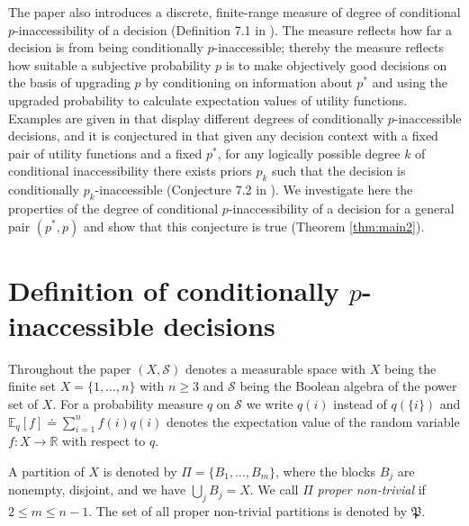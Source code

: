 \documentclass[10pt, letterpaper]{article}%
\theoremstyle{definition}
\newcommand{\E}{\mathbb E}
\newcommand{\1}{\mathbf 1}
\begin{document}
The paper \cite{Redei-Jing2026} also introduces a discrete, finite-range measure of degree of conditional $p$-inaccessibility of a decision (Definition 7.1 in \cite{Redei-Jing2026}). The measure reflects how far a decision is from being conditionally $p$-inaccessible; thereby the measure reflects how suitable a subjective probability $p$ is to make objectively good decisions on the basis of upgrading $p$ by conditioning on information about $p^*$ and using the upgraded probability to calculate expectation values of utility functions. Examples are given in \cite{Redei-Jing2026} that display different degrees of conditionally $p$-inaccessible decisions, and it is conjectured in \cite{Redei-Jing2026} that given any decision context with a fixed pair of utility functions and a fixed $p^*$, for any logically possible degree $k$ of conditional inaccessibility there exists priors $p_k$ such that the decision is conditionally $p_k$-inaccessible (Conjecture 7.2 in \cite{Redei-Jing2026}). We investigate here the properties of the degree of conditional $p$-inaccessibility of a decision for a general pair $(p^*,p)$ and show that this conjecture is true (Theorem \ref{thm:main2}). 

\section{Definition of conditionally $p$-inaccessible decisions\label{sec:defs}}

Throughout the paper $(X,\mathcal{S})$ denotes a measurable space with $X$ being the finite set $X=\{1,\dots,n\}$ with $n\ge 3$ and $\mathcal{S}$ being the Boolean algebra of the power set of $X$. For a probability measure $q$ on $\mathcal{S}$ we write $q(i)$ instead of $q(\{i\})$ and $\E_q[f]\doteq \sum_{i=1}^n f(i)q(i)$ denotes the expectation value of the random variable $f\colon X\to \mathbb{R}$ with respect to $q$. 
 
A partition of $X$ is denoted by $\Pi = \{B_1,\dots,B_m\}$, where the blocks $B_j$ are nonempty, disjoint, and we have $\bigcup_j B_j=X$. We call $\Pi$ \emph{proper non-trivial} if $2\le m\le n-1$. The set of all proper non-trivial partitions is denoted by $\mathfrak P$. 
\end{document}

